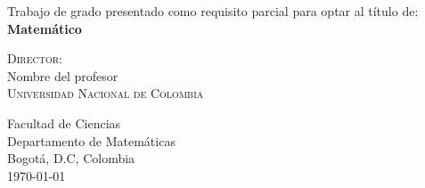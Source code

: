 \thispagestyle{empty}

\begin{center}
\vspace*{2cm}
\noindent
{}

\vspace*{3.5cm}
\begin{minipage}{\linewidth}

\centering \scshape \printauthor 
\vspace*{3.5cm}

\fontsize{12pt}{12pt}\selectfont Trabajo de grado presentado como requisito parcial para optar al título de:\\
\fontsize{12pt}{12pt}\selectfont \textbf{Matemático}\\
\vspace{3.5cm}

\textsc{Director:}\\
\vspace{0.1cm}
Nombre del profesor\\
\scshape
Universidad Nacional de Colombia
\vspace{3.5cm}

\fontsize{13pt}{13pt}\selectfont Facultad de Ciencias\\
\vspace{0.1cm}
Departamento de Matemáticas\\
\vspace{0.1cm}
Bogotá, D.C, Colombia\\
\vspace{0.1cm}
\today
\end{minipage}
\end{center}